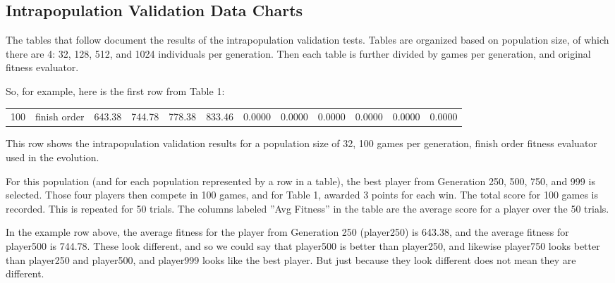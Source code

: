 \clearpage
\begin{landscape}
\thispagestyle{empty}
\setcounter{secnumdepth}{1}
\chapter{Intrapopulation Validation Data Charts}
\label{appendix:intravalidation}

The tables that follow document the results of the intrapopulation validation
tests. Tables are organized based on population size, of which there are 4: 32,
128, 512, and 1024 individuals per generation. Then each table is further
divided by games per generation, and original fitness evaluator.

So, for example, here is the first row from Table 1:

\begin{table}[ht]
  \centering
    \begin{tabularx}{\linewidth}{|p{1in}|p{1in}|r|r|r|r|r|r|r|r|r|r|}
 \cline{1-12}
      \multirow{1}{*}{100} & finish order & 643.38 & 744.78 & 778.38 & 833.46 & 0.0000 & 0.0000 & 0.0000 & 0.0000 & 0.0000 & 0.0000 \\
 \cline{1-12}
    \end{tabularx}%
\end{table}%

This row shows the intrapopulation validation results for a population size of
32, 100 games per generation, finish order fitness evaluator used in the
evolution.

For this population (and for each population represented by a row in a table),
the best player from Generation 250, 500, 750, and 999 is selected. Those four
players then compete in 100 games, and for Table 1, awarded 3 points for each 
win. The total score for 100 games is recorded. This is repeated for 50 trials.
The columns labeled ''Avg Fitness'' in the table are the average score for a
player over the 50 trials.

In the example row above, the average fitness for the player from Generation 250
(player250) is 643.38, and the average fitness for player500 is 744.78. These
look different, and so we could say that player500 is better than player250, and
likewise player750 looks better than player250 and player500, and player999
looks like the best player. But just because they look different does not mean
they are different.


\end{landscape}
